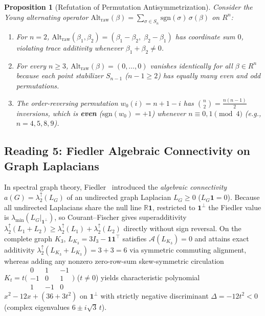 \documentclass[11pt,a4paper]{article}
\theoremstyle{plain}
\newtheorem{proposition}[theorem]{Proposition}
\theoremstyle{definition}
\newcommand{\R}{\mathbb{R}}
\newcommand{\Ap}{\mathcal{A}}
\newcommand{\Alt}{\mathrm{Alt}}
\begin{document}
\begin{proposition}[Refutation of Permutation Antisymmetrization]\label{prop:refute4}
Consider the Young alternating operator $\Alt_{\mathrm{raw}}(\beta) = \sum_{\sigma \in S_n} \mathrm{sgn}(\sigma)\,\sigma(\beta)$ on $R^n$:
\begin{enumerate}
  \item For $n = 2$, $\Alt_{\mathrm{raw}}(\beta_1, \beta_2) = (\beta_1 - \beta_2,\; \beta_2 - \beta_1)$ has coordinate sum $0$, violating trace additivity whenever $\beta_1 + \beta_2 \ne 0$.
  \item For every $n \ge 3$, $\Alt_{\mathrm{raw}}(\beta) = (0, \dots, 0)$ vanishes identically for all $\beta \in R^n$ because each point stabilizer $S_{n-1}$ ($n - 1 \ge 2$) has equally many even and odd permutations.
  \item The order-reversing permutation $w_0(i) = n + 1 - i$ has $\binom{n}{2} = \frac{n(n-1)}{2}$ inversions, which is \textbf{even} ($\mathrm{sgn}(w_0) = +1$) whenever $n \equiv 0, 1 \pmod{4}$ (e.g., $n = 4, 5, 8, 9$).
\end{enumerate}
\end{proposition}

\subsection{Reading 5: Fiedler Algebraic Connectivity on Graph Laplacians}
In spectral graph theory, Fiedler~\cite{Fiedler1973} introduced the \emph{algebraic connectivity} $a(G) = \lambda_2^\uparrow(L_G)$ of an undirected graph Laplacian $L_G \ge 0$ ($L_G \mathbf{1} = 0$). Because all undirected Laplacians share the null line $\R \mathbf{1}$, restricted to $\mathbf{1}^\perp$ the Fiedler value is $\lambda_{\min}(L_G|_{\mathbf{1}^\perp})$, so Courant--Fischer gives superadditivity $\lambda_2^\uparrow(L_1 + L_2) \ge \lambda_2^\uparrow(L_1) + \lambda_2^\uparrow(L_2)$ directly without sign reversal. On the complete graph $K_3$, $L_{K_3} = 3 I_3 - \mathbf{1}\mathbf{1}^\top$ satisfies $\Ap(L_{K_3}) = 0$ and attains exact additivity $\lambda_2^\uparrow(L_{K_3} + L_{K_3}) = 3 + 3 = 6$ via symmetric commuting alignment, whereas adding any nonzero zero-row-sum skew-symmetric circulation $K_t = t\bigl(\begin{smallmatrix}0&1&-1\\-1&0&1\\1&-1&0\end{smallmatrix}\bigr)$ ($t \ne 0$) yields characteristic polynomial $x^2 - 12x + (36 + 3t^2)$ on $\mathbf{1}^\perp$ with strictly negative discriminant $\Delta = -12 t^2 < 0$ (complex eigenvalues $6 \pm i\sqrt{3}\,t$).
\end{document}
